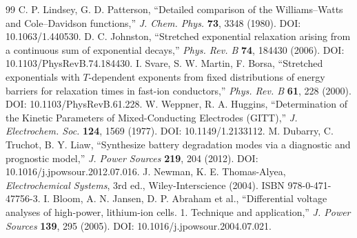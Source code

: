\documentclass[11pt,a4paper]{article}
\begin{document}
\begin{thebibliography}{99}
 C. P. Lindsey, G. D. Patterson, ``Detailed comparison of the Williams--Watts and Cole--Davidson functions,'' \emph{J. Chem. Phys.} \textbf{73}, 3348 (1980). DOI: 10.1063/1.440530.
 D. C. Johnston, ``Stretched exponential relaxation arising from a continuous sum of exponential decays,'' \emph{Phys. Rev. B} \textbf{74}, 184430 (2006). DOI: 10.1103/PhysRevB.74.184430.
 I. Svare, S. W. Martin, F. Borsa, ``Stretched exponentials with $T$-dependent exponents from fixed distributions of energy barriers for relaxation times in fast-ion conductors,'' \emph{Phys. Rev. B} \textbf{61}, 228 (2000). DOI: 10.1103/PhysRevB.61.228.
 W. Weppner, R. A. Huggins, ``Determination of the Kinetic Parameters of Mixed-Conducting Electrodes (GITT),'' \emph{J. Electrochem. Soc.} \textbf{124}, 1569 (1977). DOI: 10.1149/1.2133112.
 M. Dubarry, C. Truchot, B. Y. Liaw, ``Synthesize battery degradation modes via a diagnostic and prognostic model,'' \emph{J. Power Sources} \textbf{219}, 204 (2012). DOI: 10.1016/j.jpowsour.2012.07.016.
 J. Newman, K. E. Thomas-Alyea, \emph{Electrochemical Systems}, 3rd ed., Wiley-Interscience (2004). ISBN 978-0-471-47756-3.
 I. Bloom, A. N. Jansen, D. P. Abraham et al., ``Differential voltage analyses of high-power, lithium-ion cells. 1. Technique and application,'' \emph{J. Power Sources} \textbf{139}, 295 (2005). DOI: 10.1016/j.jpowsour.2004.07.021.
\end{thebibliography}
\end{document}
